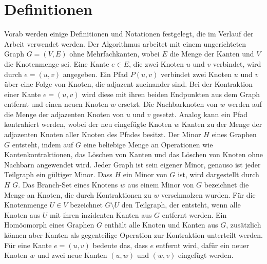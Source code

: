 \chapter{Definitionen}
\label{cha:definitionen}

Vorab werden einige Definitionen und Notationen festgelegt, die im Verlauf der Arbeit verwendet werden.
Der Algorithmus arbeitet mit einem ungerichteten Graph $G = (V, E)$ ohne Mehrfachkanten, wobei $E$ die Menge der Kanten und $V$ die Knotenmenge sei.
Eine Kante $e \in E$, die zwei Knoten $u$ und $v$ verbindet, wird durch $e = (u, v)$ angegeben.
Ein Pfad $P(u, v)$ verbindet zwei Knoten $u$ und $v$ über eine Folge von Knoten, die adjazent zueinander sind.
Bei der Kontraktion einer Kante $e = (u, v)$ wird diese mit ihren beiden Endpunkten aus dem Graph entfernt und einen neuen Knoten $w$ ersetzt.
Die Nachbarknoten von $w$ werden auf die Menge der adjazenten Knoten von $u$ und $v$ gesetzt.
Analog kann ein Pfad kontrahiert werden, wobei der neu eingefügte Knoten $w$ Kanten zu der Menge der adjazenten Knoten aller Knoten des Pfades besitzt. %
Der Minor $H$ eines Graphen $G$ entsteht, indem auf $G$ eine beliebige Menge an Operationen wie Kantenkontraktionen, das Löschen von Kanten und das Löschen von Knoten ohne Nachbarn angewendet wird.
Jeder Graph ist sein eigener Minor, genauso ist jeder Teilgraph ein gültiger Minor.
Dass $H$ ein Minor von $G$ ist, wird dargestellt durch $H$ \minor $G$.
Das Branch-Set eines Knotens $w$ aus einem Minor von $G$ bezeichnet die Menge an Knoten, die durch Kontraktionen zu $w$ verschmolzen wurden. %
Für die Knotenmenge $U \in V$ bezeichnet $G \setminus U$ den Teilgraph, der entsteht, wenn alle Knoten aus $U$ mit ihren inzidenten Kanten aus $G$ entfernt werden.
Ein Homöomorph eines Graphen $G$ enthält alle Knoten und Kanten aus $G$, zusätzlich können aber Kanten als gegenteilige Operation zur Kontraktion unterteilt werden.
Für eine Kante $e = (u, v)$ bedeute das, dass $e$ entfernt wird, dafür ein neuer Knoten $w$ und zwei neue Kanten $(u, w)$ und $(w, v)$ eingefügt werden.

